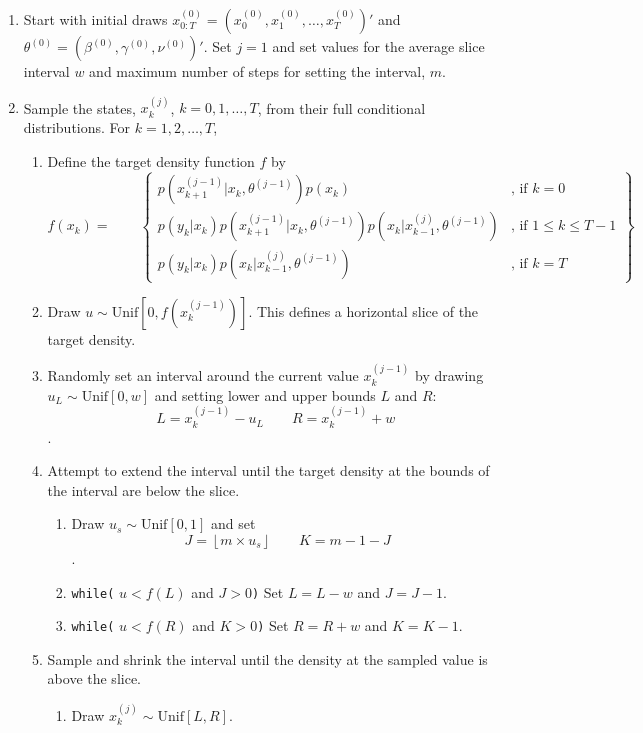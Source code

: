 \documentclass{article}
\begin{document}
\begin{enumerate}
\item Start with initial draws $x^{(0)}_{0:T} = (x^{(0)}_0, x^{(0)}_1, \ldots, x^{(0)}_T)'$ and $\theta^{(0)} = (\beta^{(0)}, \gamma^{(0)}, \nu^{(0)})'$. Set $j = 1$ and set values for the average slice interval $w$ and maximum number of steps for setting the interval, $m$.
\item \label{step:gibbs} Sample the states, $x^{(j)}_k$, $k = 0,1,\ldots,T$, from their full conditional distributions. For $k = 1, 2, \ldots, T$,
    \begin{enumerate}[label=\alph*.,leftmargin=1.75\parindent]
    \item Define the target density function $f$ by
    \[f(x_k) = \qquad \left\{
    \begin{array}{cc}
    p(x^{(j-1)}_{k+1}|x_k,\theta^{(j-1)})p(x_k) & \mbox{, if } k = 0 \\
    p(y_k|x_k)p(x^{(j-1)}_{k+1}|x_k,\theta^{(j-1)})p(x_k|x^{(j)}_{k-1},\theta^{(j-1)}) & \mbox{, if } 1 \le k \le T-1 \\
    p(y_k|x_k)p(x_k|x^{(j)}_{k-1},\theta^{(j-1)}) & \mbox{, if } k = T
    \end{array}
    \right\}\]
    \item Draw $u \sim \mbox{Unif}[0,f(x^{(j-1)}_k)]$. This defines a horizontal slice of the target density.
    \item Randomly set an interval around the current value $x^{(j-1)}_k$ by drawing $u_L \sim \mbox{Unif}[0,w]$ and setting lower and upper bounds $L$ and $R$: \[L = x^{(j-1)}_k - u_L \qquad R = x^{(j-1)}_k + w\].
    \item Attempt to extend the interval until the target density at the bounds of the interval are below the slice.
      \begin{enumerate}
      \item Draw $u_s \sim \mbox{Unif}[0,1]$ and set \[J = \left \lfloor{m\times u_s}\right \rfloor \qquad K = m - 1 - J \].
      \item {\tt while(} $u < f(L)$ and $J > 0${\tt)} Set $L = L - w$ and $J = J - 1$.
      \item {\tt while(} $u < f(R)$ and $K > 0${\tt)} Set $R = R + w$ and $K = K - 1$.
      \end{enumerate}
    \item Sample and shrink the interval until the density at the sampled value is above the slice.
      \begin{enumerate}
      \item Draw $x^{(j)}_k \sim \mbox{Unif}[L,R]$. \label{step:samp}

\end{enumerate}
\end{enumerate}
\end{enumerate}
\end{document}
